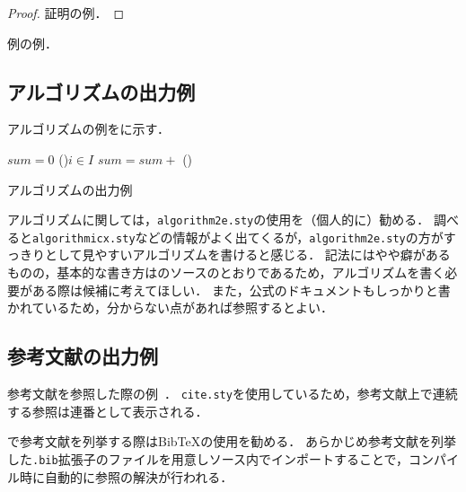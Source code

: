 \begin{proof}
  証明の例．
\end{proof}

\begin{example}\label{eg:example}
  例の例．
  \END
\end{example}



\subsection{アルゴリズムの出力例}

アルゴリズムの例を\Fig{\ref{fig:algo:sample}}に示す．

\begin{algorithm}[t]
  \small
  \DontPrintSemicolon
  $sum = 0$\;
  \ForEach(){$i \in I$}{
    $sum = sum +$ 
  }
  \BlankLine
  \Proc(){}{
  }
  \caption{アルゴリズムの出力例}
  \label{fig:algo:sample}
\end{algorithm}

アルゴリズムに関しては，\texttt{algorithm2e.sty}の使用を（個人的に）勧める．
調べると\texttt{algorithmicx.sty}などの情報がよく出てくるが，\texttt{algorithm2e.sty}の方がすっきりとして見やすいアルゴリズムを書けると感じる．
記法にはやや癖があるものの，基本的な書き方は\Fig{\ref{fig:algo:sample}}のソースのとおりであるため，アルゴリズムを書く必要がある際は候補に考えてほしい．
また，公式のドキュメントもしっかりと書かれているため，分からない点があれば参照するとよい．



\subsection{参考文献の出力例}

参考文献を参照した際の例~\cite{book:Codd2002,book:Bayer2002:1,book:Bayer2002:2}．
\texttt{cite.sty}を使用しているため，参考文献上で連続する参照は連番として表示される．

{\LaTeXe}で参考文献を列挙する際はBibTeXの使用を勧める．
あらかじめ参考文献を列挙した\texttt{.bib}拡張子のファイルを用意し{\LaTeXe}ソース内でインポートすることで，コンパイル時に自動的に参照の解決が行われる．
